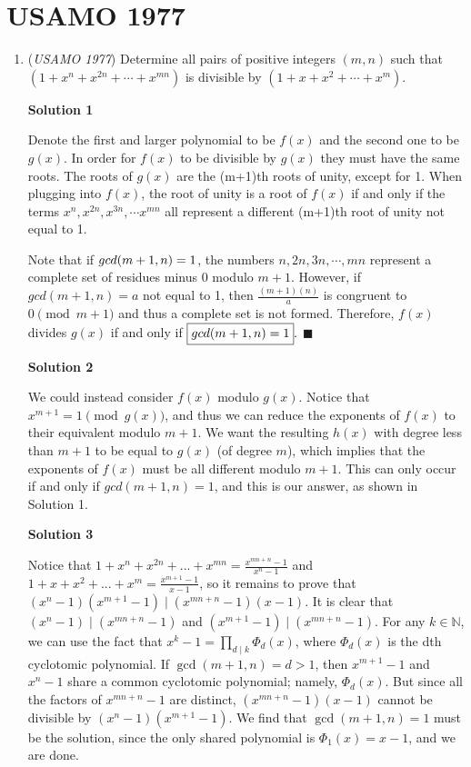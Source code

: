 \section{USAMO 1977}
        \begin{enumerate}
        	\item (\textit{USAMO 1977}) Determine all pairs of positive integers $(m,n)$ such that
$(1+x^n+x^{2n}+\cdots+x^{mn})$ is divisible by $(1+x+x^2+\cdots+x^{m})$.


 



\textbf{Solution 1}

Denote the first and larger polynomial to be $f(x)$ and the second one to be $g(x)$. In order for $f(x)$ to be divisible by $g(x)$ they must have the same roots. The roots of $g(x)$ are the (m+1)th roots of unity, except for 1. When plugging into $f(x)$, the root of unity is a root of $f(x)$ if and only if the terms $x^n, x^{2n}, x^{3n}, \cdots x^{mn}$ all represent a different (m+1)th root of unity not equal to 1. 

 Note that if $\\gcd(m+1,n)=1$, the numbers $n, 2n, 3n, \cdots, mn$ represent a complete set of residues minus 0 modulo $m+1$. However, if $gcd(m+1,n)=a$ not equal to 1, then $\frac{(m+1)(n)}{a}$ is congruent to $0 \pmod {m+1}$ and thus a complete set is not formed. Therefore, $f(x)$ divides $g(x)$ if and only if $\boxed{\\gcd(m+1,n)=1}.$ $\blacksquare$




\textbf{Solution 2}

We could instead consider $f(x)$ modulo $g(x)$. Notice that $x^{m+1} = 1 \pmod {g(x)}$, and thus we can reduce the exponents of $f(x)$ to their equivalent modulo $m+1$. We want the resulting $h(x)$ with degree less than $m+1$ to be equal to $g(x)$ (of degree $m$), which implies that the exponents of $f(x)$ must be all different modulo $m+1$. This can only occur if and only if $gcd(m+1, n) = 1$, and this is our answer, as shown in Solution 1.

 



\textbf{Solution 3}

Notice that $1+x^n+x^{2n}+...+x^{mn}=\frac{x^{mn+n}-1}{x^n-1}$ and $1+x+x^2+...+x^m=\frac{x^{m+1}-1}{x-1}$, so it remains to prove that $(x^n-1)(x^{m+1}-1) \mid (x^{mn+n}-1)(x-1)$. It is clear that $(x^n-1) \mid (x^{mn+n}-1)$ and $(x^{m+1}-1) \mid (x^{mn+n}-1)$. For any $k \in \mathbb{N}$, we can use the fact that $x^k-1=\prod_{d \mid k} \Phi _d(x)$, where $\Phi _d(x)$ is the dth cyclotomic polynomial. If $\gcd(m+1,n) = d > 1$, then $x^{m+1}-1$ and $x^n-1$ share a common cyclotomic polynomial; namely, $\Phi _d(x)$. But since all the factors of $x^{mn+n}-1$ are distinct, $(x^{mn+n}-1)(x-1)$ cannot be divisible by $(x^n-1)(x^{m+1}-1)$. We find that $\gcd(m+1,n) = 1$ must be the solution, since the only shared polynomial is $\Phi _1(x)=x-1$, and we are done.


\end{enumerate}
